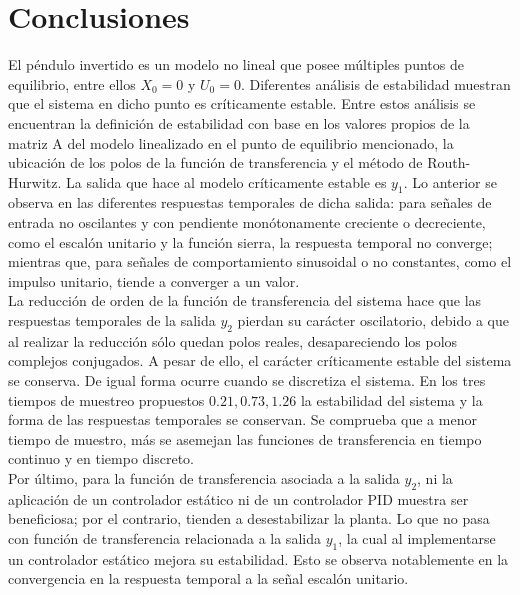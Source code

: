 \documentclass[journal]{IEEEtran}
\begin{document}



\section{Conclusiones}
El péndulo invertido es un modelo no lineal que posee múltiples puntos de equilibrio, entre ellos $X_0=0$ y $U_0=0$. Diferentes análisis de estabilidad muestran que el sistema en dicho punto es críticamente estable. Entre estos análisis se encuentran la definición de estabilidad con base en los valores propios de la matriz A del modelo linealizado en el punto de equilibrio mencionado, la ubicación de los polos de la función de transferencia y el método de Routh-Hurwitz. La salida que hace al modelo críticamente estable es $y_1$. Lo anterior se observa en las diferentes respuestas temporales de dicha salida: para señales de entrada no oscilantes y con pendiente monótonamente creciente o decreciente, como el escalón unitario y la función sierra, la respuesta temporal no converge; mientras que, para señales de comportamiento sinusoidal o no constantes, como el impulso unitario, tiende a converger a un valor.\\

La reducción de orden de la función de transferencia del sistema hace que las respuestas temporales de la salida $y_2$ pierdan su carácter oscilatorio, debido a que al realizar la reducción sólo quedan polos reales, desapareciendo los polos complejos conjugados. A pesar de ello, el carácter críticamente estable del sistema se conserva. De igual forma ocurre cuando se discretiza el sistema. En los tres tiempos de muestreo propuestos $0.21, 0.73,1.26$ la estabilidad del sistema y la forma de las respuestas temporales se conservan. Se comprueba que a menor tiempo de muestro, más se asemejan las funciones de transferencia en tiempo continuo y en tiempo discreto.\\


Por último, para la función de transferencia asociada a la salida $y_2$, ni la aplicación de un controlador estático ni de un controlador PID muestra ser beneficiosa; por el contrario, tienden a desestabilizar la planta. Lo que no pasa con función de transferencia relacionada a la salida $y_1$, la cual al implementarse un controlador estático mejora su estabilidad. Esto se observa notablemente en la convergencia en la respuesta temporal a la señal escalón unitario.  





\newpage

\end{document}
